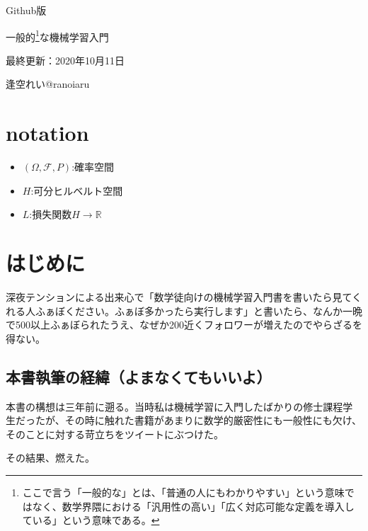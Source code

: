\documentclass{jsarticle}
\begin{document}
\begin{center}
  
  \Huge Github版 \par
  \vspace{15mm}
  \Huge 一般的\footnote{ここで言う「一般的な」とは、「普通の人にもわかりやすい」という意味ではなく、数学界隈における「汎用性の高い」「広く対応可能な定義を導入している」という意味である。}な機械学習入門\par
  \vspace{90mm}
  \Large 最終更新：2020年10月11日 \par
  \Large 逢空れい@ranoiaru\par

\end{center}
\thispagestyle{empty}
\clearpage
\addtocounter{page}{-1}







\newpage


 \tableofcontents
 \clearpage
\section*{notation}
\begin{itemize}
\item $(\Omega,\mathcal{F},P)$:確率空間
\item $H$:可分ヒルベルト空間
\item $L$:損失関数$H\to \mathbb{R}$

\end{itemize}


\newpage
\section{はじめに}

深夜テンションによる出来心で「数学徒向けの機械学習入門書を書いたら見てくれる人ふぁぼください。ふぁぼ多かったら実行します」と書いたら、なんか一晩で500以上ふぁぼられたうえ、なぜか200近くフォロワーが増えたのでやらざるを得ない。

\subsection{本書執筆の経緯（よまなくてもいいよ）}
本書の構想は三年前に遡る。当時私は機械学習に入門したばかりの修士課程学生だったが、その時に触れた書籍があまりに数学的厳密性にも一般性にも欠け、そのことに対する苛立ちをツイートにぶつけた。

その結果、燃えた。
\end{document}

